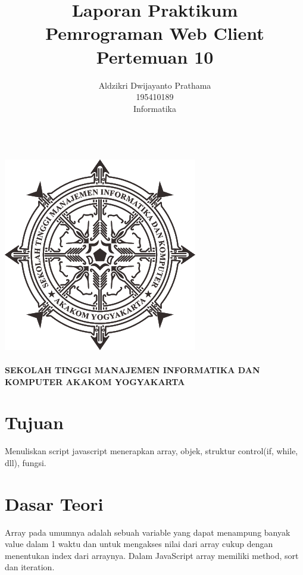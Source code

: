 \documentclass[a4paper,12pt]{article}
\begin{document}
\title{ {\Large Laporan Praktikum}\\ Pemrograman Web Client\\{\Large Pertemuan 10}}

\author{Aldzikri Dwijayanto Prathama 
	\\195410189
	\\Informatika}
\makeatletter
\begin{titlepage}
	\begin{center}
		{\huge \bfseries \@title }\\[14ex]
		\includegraphics[scale=.8]{logo}\\[4ex]
		{\large \@author}\\[12ex]
		{\large \bfseries {SEKOLAH TINGGI MANAJEMEN INFORMATIKA DAN KOMPUTER
				AKAKOM YOGYAKARTA}}
	\end{center}


\end{titlepage}
\makeatother
\renewcommand{\figurename}{Gambar}
\newpage
\tableofcontents
\newpage
\section{Tujuan}
Menuliskan script javascript menerapkan array, objek, struktur control(if, while, dll), fungsi.
\section{Dasar Teori}

Array pada umumnya adalah sebuah variable yang dapat menampung banyak
value dalam 1 waktu dan untuk mengakses nilai dari array cukup dengan
menentukan index dari arraynya. Dalam JavaScript array memiliki method, sort
dan iteration.\\
\end{document}
